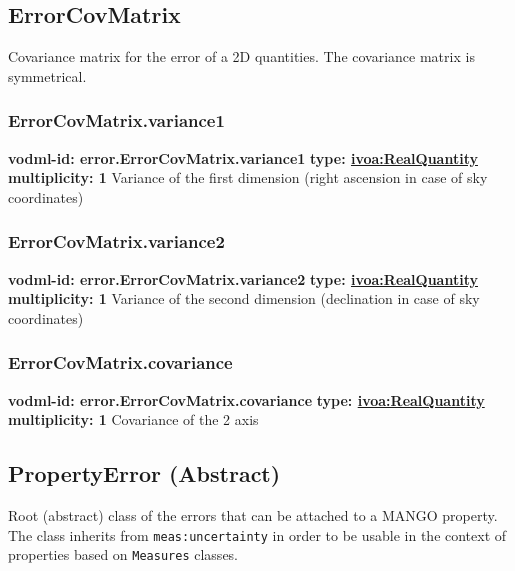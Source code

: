  \subsection{ErrorCovMatrix}
    \label{sect:error.ErrorCovMatrix}
    Covariance matrix for the error of a 2D quantities. The covariance matrix is symmetrical.

    \subsubsection{ErrorCovMatrix.variance1}
    \textbf{vodml-id: error.ErrorCovMatrix.variance1} \newline
    \textbf{type: \hyperref[sect:ivoa]{ivoa:RealQuantity}} \newline
    \textbf{multiplicity: 1} \newline
    Variance of the first dimension (right ascension in case of sky coordinates)

    \subsubsection{ErrorCovMatrix.variance2}
    \textbf{vodml-id: error.ErrorCovMatrix.variance2} \newline
    \textbf{type: \hyperref[sect:ivoa]{ivoa:RealQuantity}} \newline
    \textbf{multiplicity: 1} \newline
    Variance of the second dimension (declination in case of sky coordinates)

    \subsubsection{ErrorCovMatrix.covariance}
    \textbf{vodml-id: error.ErrorCovMatrix.covariance} \newline
    \textbf{type: \hyperref[sect:ivoa]{ivoa:RealQuantity}} \newline
    \textbf{multiplicity: 1} \newline
    Covariance of the 2 axis

  \subsection{PropertyError (Abstract)}
    \label{sect:error.PropertyError}
    Root (abstract) class of the errors that can be attached to a MANGO property. The class inherits from \texttt{meas:uncertainty} in order to be usable in the context of properties based on \texttt{Measures} classes.

